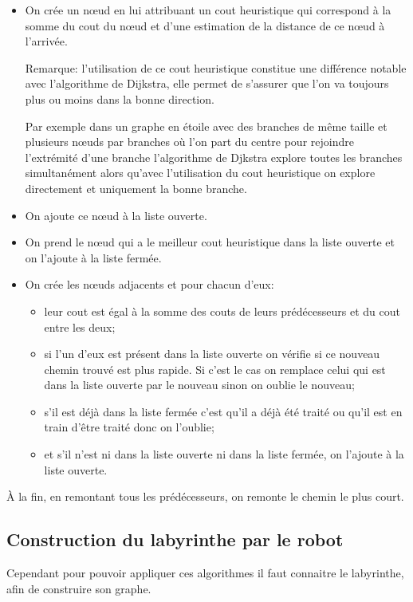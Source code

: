     \begin{itemize}
      \item On crée un nœud en lui attribuant un cout heuristique qui
        correspond à la somme du cout du nœud et d'une estimation de la distance de ce
        nœud à l'arrivée.

        Remarque: l'utilisation de ce cout heuristique constitue une différence
        notable avec l'algorithme de Dijkstra, elle permet de s'assurer que
        l'on va toujours plus ou moins dans la bonne direction.

        Par exemple dans un graphe en étoile avec des branches de même taille
        et plusieurs nœuds par branches où l'on part du centre pour rejoindre
        l'extrémité d'une branche l'algorithme de Djkstra explore toutes les
        branches simultanément alors qu'avec l'utilisation du cout heuristique
        on explore directement et uniquement la bonne branche.
      \item On ajoute ce nœud à la liste ouverte.
      \item On prend le nœud qui a le meilleur cout heuristique dans la liste
        ouverte et on l'ajoute à la liste fermée.
      \item On crée les nœuds adjacents et pour chacun d'eux:
        \begin{itemize}
          \item leur cout est égal à la somme des couts de leurs prédécesseurs
            et du cout entre les deux;
          \item si l'un d'eux est présent dans la liste ouverte on vérifie si
            ce nouveau chemin trouvé est plus rapide. Si c'est le cas on
            remplace celui qui est dans la liste ouverte par le nouveau sinon
            on oublie le nouveau;
          \item s'il est déjà dans la liste fermée c'est qu'il a déjà été
            traité ou qu'il est en train d'être traité donc on l'oublie;
          \item et s'il n'est ni dans la liste ouverte ni dans la liste fermée,
            on l'ajoute à la liste ouverte.
        \end{itemize}
    \end{itemize}

    À la fin, en remontant tous les prédécesseurs, on remonte le chemin le plus
    court.

  \subsection{Construction du labyrinthe par le robot}
    Cependant pour pouvoir appliquer ces algorithmes il faut connaitre le
    labyrinthe, afin de construire son graphe.

